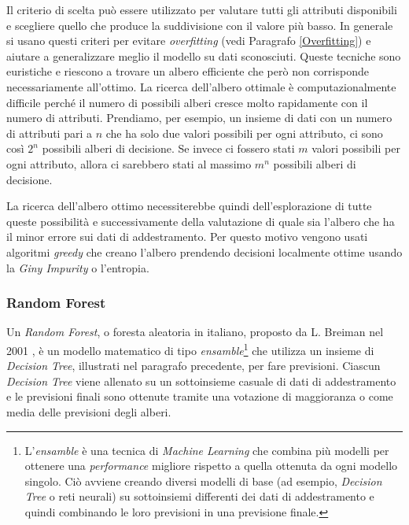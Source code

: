\documentclass[12pt,italian]{report}
\begin{document}
	Il criterio di scelta può essere utilizzato per valutare tutti gli attributi disponibili e scegliere quello che produce la suddivisione con il valore più basso.
	In generale si usano questi criteri per evitare \textit{overfitting} (vedi Paragrafo \ref{Overfitting}) e aiutare a generalizzare meglio il modello su dati sconosciuti.
	Queste tecniche sono euristiche e riescono a trovare un albero efficiente che però non corrisponde necessariamente all'ottimo. La ricerca dell'albero ottimale è computazionalmente difficile perché il numero di possibili alberi cresce molto rapidamente con il numero di attributi. Prendiamo, per esempio, un insieme di dati con un numero di attributi pari a $n$ che ha solo due valori possibili per ogni attributo, ci sono così $2^n$ possibili alberi di decisione. Se invece ci fossero stati $m$ valori possibili per ogni attributo, allora ci sarebbero stati al massimo $m^n$ possibili alberi di decisione.
	
	La ricerca dell'albero ottimo necessiterebbe quindi dell'esplorazione di tutte queste possibilità e successivamente della valutazione di quale sia l'albero che ha il minor errore sui dati di addestramento. Per questo motivo vengono usati algoritmi \textit{greedy} che creano l'albero prendendo decisioni localmente ottime usando la \textit{Giny Impurity} o l'entropia.


	\subsubsection{Random Forest}
	\label{RandomForest}
	Un \textit{Random Forest}, o foresta aleatoria in italiano, proposto da L. Breiman nel 2001 \cite{Breiman2001}, è un modello matematico di tipo \textit{ensamble}\footnote{L'\textit{ensamble} è una tecnica di \textit{Machine Learning} che combina più modelli per ottenere una \textit{performance} migliore rispetto a quella ottenuta da ogni modello singolo. Ciò avviene creando diversi modelli di base (ad esempio, \textit{Decision Tree} o reti neurali) su sottoinsiemi differenti dei dati di addestramento e quindi combinando le loro previsioni in una previsione finale.} che utilizza un insieme di \textit{Decision Tree}, illustrati nel paragrafo precedente, per fare previsioni. Ciascun \textit{Decision Tree} viene allenato su un sottoinsieme casuale di dati di addestramento e le previsioni finali sono ottenute tramite una votazione di maggioranza o come media delle previsioni degli alberi. 
	
\end{document}
